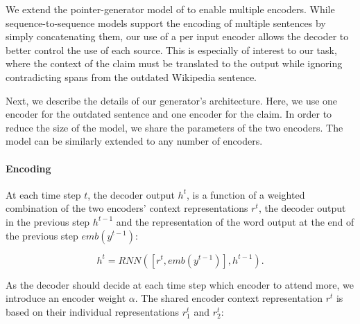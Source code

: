 \documentclass[letterpaper]{article} %
\begin{document}
We extend the pointer-generator model of \cite{pointer-generator} to enable multiple encoders. While sequence-to-sequence models support the encoding of multiple sentences by simply concatenating them, our use of a per input encoder allows the decoder to better control the use of each source. This is especially of interest to our task, where the context of the claim must be translated to the output while ignoring contradicting spans from the outdated Wikipedia sentence. 

Next, we describe the details of our generator's architecture. Here, we use one encoder for the outdated sentence and one encoder for the claim. In order to reduce the size of the model, we share the parameters of the two encoders. The model can be similarly extended to any number of encoders.



\paragraph{Encoding}
At each time step $t$, the decoder output $h^t$, is a function of a weighted combination of the two encoders' context representations $r^{t}$, the decoder output in the previous step $h^{t-1}$ and the representation of the word output at the end of the previous step $emb(y^{t-1})$: 

\begin{equation}
    h^t = \textit{RNN}([r^t, emb(y^{t-1})], h^{t-1}).
    \label{eq:decoder}
\end{equation}

As the decoder should decide at each time step which encoder to attend more, we introduce an encoder weight $\alpha$. The shared encoder context representation $r^t$ is based on their individual representations $r^t_1$ and $r^t_2$: 
\end{document}
